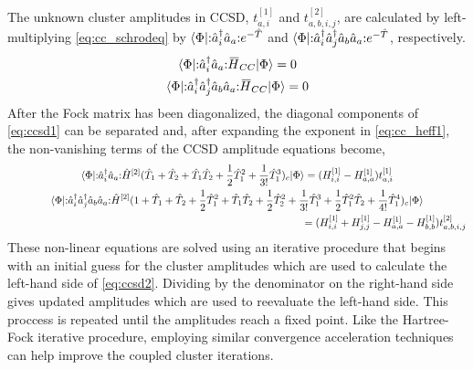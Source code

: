 The unknown cluster amplitudes in CCSD, $t_{a, i}^{[1]}$ and $t_{a, b, i, j}^{[2]}$, are calculated by left-multiplying \eqref{eq:cc_schrodeq} by $\langle \Phi |\mathopen:  \hat a_{i}^\dagger \hat a_{a} \mathclose:e^{-\hat{T}}$ and $\langle \Phi |\mathopen:  \hat a_{i}^\dagger \hat a_{j}^\dagger \hat a_{b} \hat a_{a} \mathclose:e^{-\hat{T}}$, respectively.
\begin{gather}\label{eq:ccsd1}
\bra{\Phi}\normord{ \hat a_{i}^\dagger \hat a_{a}}\overbar{H}_{CC}\ket{\Phi} = 0 \\
\bra{\Phi}\normord{ \hat a_{i}^\dagger \hat a_{j}^\dagger \hat a_{b} \hat a_{a}}\overbar{H}_{CC}\ket{\Phi} = 0 \notag
\end{gather}
After the Fock matrix has been diagonalized, the diagonal components of \eqref{eq:ccsd1} can be separated and, after expanding the exponent in \eqref{eq:cc_heff1}, the non-vanishing terms of the CCSD amplitude equations become,
\begin{gather}\label{eq:ccsd2}
\bra{\Phi}\normord{ \hat a_{i}^\dagger \hat a_{a}} \hat{H}^{[2]}( \hat{T}_{1} + \hat{T}_{2} + \hat{T}_{1}\hat{T}_{2} + \frac{1}{2}\hat{T}_{1}^{2} + \frac{1}{3!}\hat{T}_{1}^{3} )_{c} \ket{\Phi} = (H_{i,i}^{[1]} - H_{a,a}^{[1]})t_{a, i}^{[1]} \\
\bra{\Phi}\normord{ \hat a_{i}^\dagger \hat a_{j}^\dagger \hat a_{b} \hat a_{a}} \hat{H}^{[2]}( 1 + \hat{T}_{1} + \hat{T}_{2} + \frac{1}{2}\hat{T}_{1}^{2} + \hat{T}_{1}\hat{T}_{2} + \frac{1}{2}\hat{T}_{2}^{2} + \frac{1}{3!}\hat{T}_{1}^{3} + \frac{1}{2}\hat{T}_{1}^{2}\hat{T}_{2} + \frac{1}{4!}\hat{T}_{1}^{4} )_{c} \ket{\Phi} \notag \\
\hspace{10cm} = (H_{i,i}^{[1]} + H_{j,j}^{[1]} - H_{a,a}^{[1]} - H_{b,b}^{[1]})t_{a, b, i, j}^{[2]} \notag
\end{gather}
These non-linear equations are solved using an iterative procedure that begins with an initial guess for the cluster amplitudes which are used to calculate the left-hand side of \eqref{eq:ccsd2}. Dividing by the denominator on the right-hand side gives updated amplitudes which are used to reevaluate the left-hand side. This proccess is repeated until the amplitudes reach a fixed point. Like the Hartree-Fock iterative procedure, employing similar convergence acceleration techniques can help improve the coupled cluster iterations.

